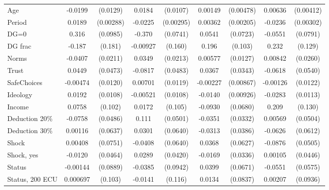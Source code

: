 \begin{tabular}{l|cccccc|cc}
Age             &  -0.0199         & (0.0129)&   0.0184\sym{*}  & (0.0107)&  0.00149         &(0.00478)&  0.00636         &(0.00412)\\
Period          &   0.0189\sym{***}&(0.00288)&  -0.0225\sym{***}&(0.00295)&  0.00362\sym{*}  &(0.00205)&  -0.0236\sym{***}&(0.00302)\\
DG=0          &    0.316\sym{***}& (0.0985)&   -0.370\sym{***}& (0.0741)&   0.0541         & (0.0723)&  -0.0551         & (0.0791)\\
DG frac         &   -0.187         &  (0.181)& -0.00927         &  (0.160)&    0.196\sym{*}  &  (0.103)&    0.232\sym{*}  &  (0.129)\\
Norms           &  -0.0407\sym{*}  & (0.0211)&   0.0349         & (0.0213)&  0.00577         & (0.0127)&  0.00842         & (0.0260)\\
Trust         &   0.0449         & (0.0473)&  -0.0817\sym{*}  & (0.0483)&   0.0367         & (0.0343)&  -0.0618         & (0.0540)\\
SafeChoices     & -0.00474         & (0.0120)&  0.00701         & (0.0119)& -0.00227         &(0.00867)& -0.00126         & (0.0122)\\
Ideology        &   0.0192\sym{*}  & (0.0108)& -0.00521         & (0.0108)&  -0.0140         &(0.00926)&  -0.0283\sym{**} & (0.0113)\\
Income          &   0.0758         &  (0.102)&   0.0172         &  (0.105)&  -0.0930         & (0.0680)&    0.209         &  (0.130)\\
Deduction 20\%&  -0.0758         & (0.0486)&    0.111\sym{**} & (0.0501)&  -0.0351         & (0.0332)&  0.00569         & (0.0504)\\
Deduction 30\%&  0.00116         & (0.0637)&   0.0301         & (0.0640)&  -0.0313         & (0.0386)&  -0.0626         & (0.0612)\\
Shock         &  0.00408         & (0.0751)&  -0.0408         & (0.0640)&   0.0368         & (0.0627)&  -0.0876\sym{*}  & (0.0505)\\
Shock, yes    &  -0.0120         & (0.0464)&   0.0289         & (0.0420)&  -0.0169         & (0.0336)&  0.00105         & (0.0446)\\
Status        & -0.00144         & (0.0889)&  -0.0385         & (0.0942)&   0.0399         & (0.0671)&  -0.0551         & (0.0575)\\
Status, 200 ECU& 0.000697         &  (0.103)&  -0.0141         &  (0.116)&   0.0134         & (0.0837)&  0.00207         & (0.0936)\\

\end{tabular}
